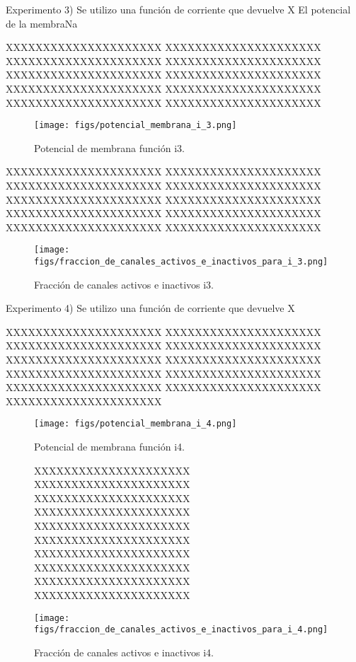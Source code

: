 \documentclass[aps,prl,twocolumn,groupedaddress]{revtex4-2}
\begin{document}
Experimento 3) Se utilizo una función de corriente que devuelve X
El potencial de la membraNa

XXXXXXXXXXXXXXXXXXXXX
XXXXXXXXXXXXXXXXXXXXX
XXXXXXXXXXXXXXXXXXXXX
XXXXXXXXXXXXXXXXXXXXX
XXXXXXXXXXXXXXXXXXXXX
XXXXXXXXXXXXXXXXXXXXX
XXXXXXXXXXXXXXXXXXXXX
XXXXXXXXXXXXXXXXXXXXX
XXXXXXXXXXXXXXXXXXXXX
XXXXXXXXXXXXXXXXXXXXX


\begin{figure}[h!]
\centering
\texttt{[image: figs/potencial\_membrana\_i\_3.png]}
\caption{Potencial de membrana función i3. \label{fig5}}
\end{figure}
XXXXXXXXXXXXXXXXXXXXX
XXXXXXXXXXXXXXXXXXXXX
XXXXXXXXXXXXXXXXXXXXX
XXXXXXXXXXXXXXXXXXXXX
XXXXXXXXXXXXXXXXXXXXX
XXXXXXXXXXXXXXXXXXXXX
XXXXXXXXXXXXXXXXXXXXX
XXXXXXXXXXXXXXXXXXXXX
XXXXXXXXXXXXXXXXXXXXX
XXXXXXXXXXXXXXXXXXXXX


\begin{figure}[h!]
\centering
\texttt{[image: figs/fraccion\_de\_canales\_activos\_e\_inactivos\_para\_i\_3.png]}
\caption{Fracción de canales activos e inactivos i3. \label{fig6}}
\end{figure}

Experimento 4) Se utilizo una función de corriente que devuelve X

XXXXXXXXXXXXXXXXXXXXX
XXXXXXXXXXXXXXXXXXXXX
XXXXXXXXXXXXXXXXXXXXX
XXXXXXXXXXXXXXXXXXXXX
XXXXXXXXXXXXXXXXXXXXX
XXXXXXXXXXXXXXXXXXXXX
XXXXXXXXXXXXXXXXXXXXX
XXXXXXXXXXXXXXXXXXXXX
XXXXXXXXXXXXXXXXXXXXX
XXXXXXXXXXXXXXXXXXXXX
XXXXXXXXXXXXXXXXXXXXX
\begin{figure}[h!]
\centering
\texttt{[image: figs/potencial\_membrana\_i\_4.png]}
\caption{Potencial de membrana función i4.\label{fig7}}
\end{figure}
\begin{figure}[h!]

XXXXXXXXXXXXXXXXXXXXX
XXXXXXXXXXXXXXXXXXXXX
XXXXXXXXXXXXXXXXXXXXX
XXXXXXXXXXXXXXXXXXXXX
XXXXXXXXXXXXXXXXXXXXX
XXXXXXXXXXXXXXXXXXXXX
XXXXXXXXXXXXXXXXXXXXX
XXXXXXXXXXXXXXXXXXXXX
XXXXXXXXXXXXXXXXXXXXX
XXXXXXXXXXXXXXXXXXXXX


\centering
\texttt{[image: figs/fraccion\_de\_canales\_activos\_e\_inactivos\_para\_i\_4.png]}
\caption{Fracción de canales activos e inactivos i4. \label{fig8}}
\end{figure}
\end{document}
